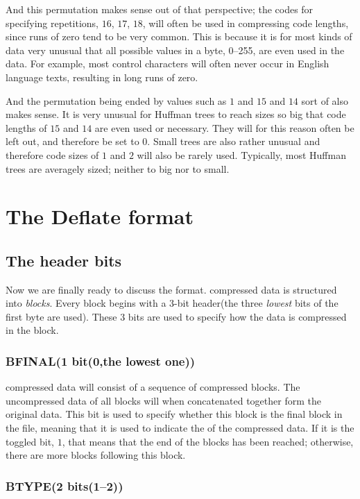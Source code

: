 And this permutation makes sense out of that perspective; the codes
for specifying repetitions, $16$, $17$, $18$, will often be used in
compressing code lengths, since runs of zero tend to be very
common. This is because it is for most kinds of data very unusual that
all possible values in a byte, 0--255, are even used in the data. For
example, most \ascii control characters will often never occur in
English language texts, resulting in long runs of zero.

And the permutation being ended by values such as $1$ and $15$ and
$14$ sort of also makes sense. It is very unusual for Huffman trees to
reach sizes so big that code lengths of $15$ and $14$ are even used or
necessary. They will for this reason often be left out, and therefore
be set to $0$. Small trees are also rather unusual and therefore code
sizes of $1$ and $2$ will also be rarely used. Typically, most Huffman
trees are averagely sized; neither to big nor to small.

\section{The Deflate format}

\subsection{The header bits}

Now we are finally ready to discuss the  format. 
compressed data is structured into \textit{blocks}. Every block begins
with a 3-bit header(the three \textit{lowest} bits of the first byte
are used). These 3 bits are used to specify how the data is compressed
in the block.

\subsubsection{BFINAL(1 bit(0,the lowest one))}

 compressed data will consist of a sequence of compressed
blocks. The uncompressed data of all blocks will when concatenated
together form the original data. This bit is used to specify whether
this block is the final block in the file, meaning that it is used to
indicate the of the compressed data. If it is the toggled bit, $1$,
that means that the end of the blocks has been reached; otherwise,
there are more blocks following this block.

\subsubsection{BTYPE(2 bits(1--2))}

